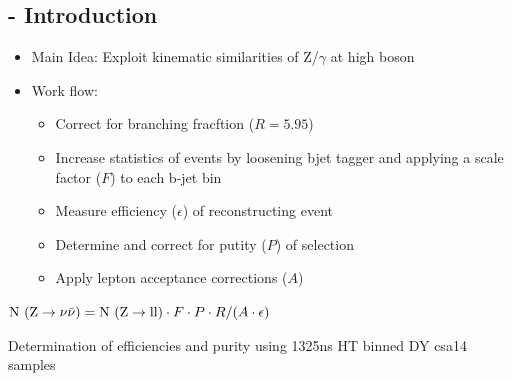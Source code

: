 \documentclass{beamer}
\begin{document}
\subsection{\photonJets - Introduction}
\begin{frame}
\begin{itemize}
 \item Main Idea: Exploit kinematic similarities of Z/$\gamma$ at high boson \pt 
 \item Work flow:
 \begin{itemize}
  \item Correct for branching fracftion ($R = 5.95$)
  \item Increase statistics of \Zll events by loosening bjet tagger and applying a scale factor ($F$) to each b-jet bin
  \item Measure efficiency ($\epsilon$) of reconstructing \Zll event
  \item Determine and correct for putity ($P$) of \Zll selection
  \item Apply lepton acceptance corrections ($A$)
 \end{itemize}
\end{itemize}
  \begin{centering}
  $\text{N }(\text{Z}\rightarrow\nu\bar{\nu}) = \text{N }(\text{Z}\rightarrow\text{ll})\cdot F \cdot P \cdot R / (A\cdot \epsilon)$
  \end{centering}
  \begin{block}{}
\centering
Determination of \Zll efficiencies and purity using 13\tev 25ns HT binned DY csa14 samples
\end{block}
\end{frame}

\end{document}
